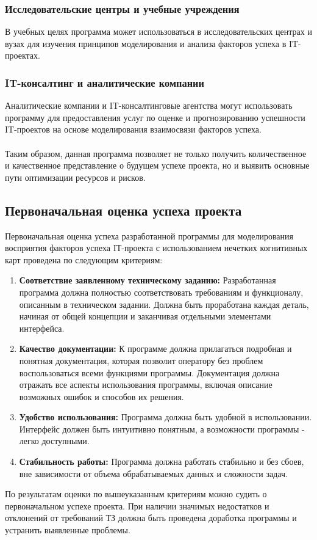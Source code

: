 \documentclass{article}
\begin{document}
    \subsubsection{Исследовательские центры и учебные учреждения}
    В учебных целях программа может использоваться в исследовательских центрах и вузах для изучения принципов моделирования и анализа факторов успеха в IT-проектах.
    \subsubsection{IT-консалтинг и аналитические компании}
    Аналитические компании и IT-консалтинговые агентства могут использовать программу для предоставления услуг по оценке и прогнозированию успешности IT-проектов на основе моделирования взаимосвязи факторов успеха.\\
    ~\\
    Таким образом, данная программа позволяет не только получить количественное и качественное представление о будущем успехе проекта, но и выявить основные пути оптимизации ресурсов и рисков.
    \subsection {Первоначальная оценка успеха проекта}
    Первоначальная оценка успеха разработанной программы для моделирования восприятия факторов успеха IТ-проекта с использованием нечетких когнитивных карт проведена по следующим критериям:
    \begin{enumerate}
        \item \textbf{Соответствие заявленному техническому заданию:} Разработанная программа должна полностью соответствовать требованиям и функционалу, описанным в техническом задании. Должна быть проработана каждая деталь, начиная от общей концепции и заканчивая отдельными элементами интерфейса.
        \item \textbf{Качество документации:} К программе должна прилагаться подробная и понятная документация, которая позволит оператору без проблем воспользоваться всеми функциями программы. Документация должна отражать все аспекты использования программы, включая описание возможных ошибок и способов их решения.
        \item \textbf{Удобство использования:} Программа должна быть удобной в использовании. Интерфейс должен быть интуитивно понятным, а возможности программы - легко доступными.
        \item \textbf{Стабильность работы:} Программа должна работать стабильно и без сбоев, вне зависимости от объема обрабатываемых данных и сложности задач.
    \end{enumerate}
    По результатам оценки по вышеуказанным критериям можно судить о первоначальном успехе проекта. При наличии значимых недостатков и отклонений от требований ТЗ должна быть проведена доработка программы и устранить выявленные проблемы.
\end{document}

